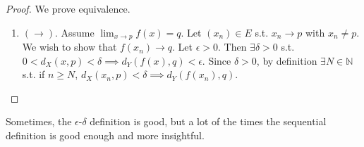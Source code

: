   \begin{proof}
    We prove equivalence. 
    \begin{enumerate}
      \item $(\rightarrow)$. Assume $\lim_{x \rightarrow p} f(x) = q$. Let $(x_n) \in E$ s.t. $x_n \rightarrow p$ with $x_n \neq p$. We wish to show that $f(x_n) \rightarrow q$. Let $\epsilon > 0$. Then $\exists \delta > 0$ s.t. $0 < d_X (x, p) < \delta \implies d_Y (f(x), q) < \epsilon$. Since $\delta > 0$, by definition $\exists N \in \mathbb{N}$ s.t. if $n \geq N$, $d_X (x_n , p) < \delta \implies d_Y (f(x_n), q)$. 
    \end{enumerate}
  \end{proof}

  Sometimes, the $\epsilon$-$\delta$ definition is good, but a lot of the times the sequential definition is good enough and more insightful. 

